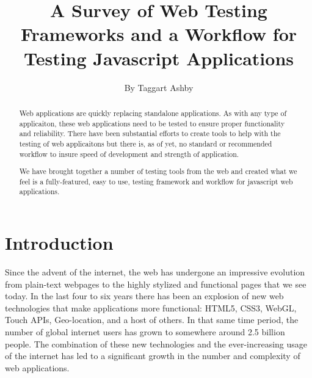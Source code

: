 \documentclass[11pt]{article}
\begin{document}

\title{\vfill A Survey of Web Testing Frameworks and a Workflow for Testing Javascript Applications} %
\author{
By Taggart Ashby \vspace{10pt} \\
}

\maketitle

\vfill  %

\begin{abstract}
Web applications are quickly replacing standalone applications. As with any type of applicaiton, these web applications need to be tested to ensure proper functionality and reliability. There have been substantial efforts to create tools to help with the testing of web applicaitons but there is, as of yet, no standard or recommended workflow to insure speed of development and strength of application.

We have brought together a number of testing tools from the web and created what we feel is a fully-featured, easy to use, testing framework and workflow for javascript web applications.
\end{abstract}

\thispagestyle{empty} %
\newpage


\setcounter{page}{1}

\section{Introduction}
Since the advent of the internet, the web has undergone an impressive evolution from plain-text webpages to the highly stylized and functional pages that we see today. In the last four to six years there has been an explosion of new web technologies that make applications more functional: HTML5, CSS3, WebGL, Touch APIs, Geo-location, and a host of others. \cite{EvolutionOfWeb} In that same time period, the number of global internet users has grown to somewhere around 2.5 billion people. \cite{EvolutionOfWeb} The combination of these new technologies and the ever-increasing usage of the internet has led to a significant growth in the number and complexity of web applications.
\end{document}
